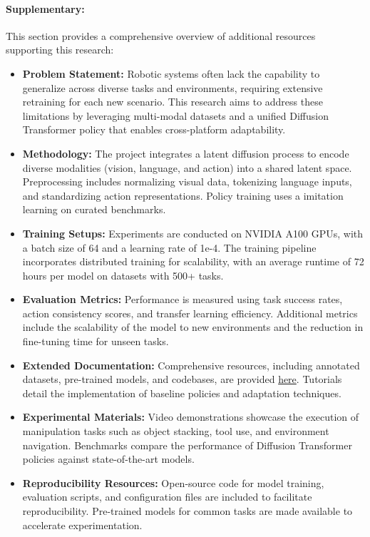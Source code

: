 \documentclass[12pt]{article}
\begin{document}
\paragraph{Supplementary:} This section provides a comprehensive overview of additional resources supporting this research:
\begin{itemize}
    \item \textbf{Problem Statement:} Robotic systems often lack the capability to generalize across diverse tasks and environments, requiring extensive retraining for each new scenario. This research aims to address these limitations by leveraging multi-modal datasets and a unified Diffusion Transformer policy that enables cross-platform adaptability.
    \item \textbf{Methodology:} The project integrates a latent diffusion process to encode diverse modalities (vision, language, and action) into a shared latent space. Preprocessing includes normalizing visual data, tokenizing language inputs, and standardizing action representations. Policy training uses a imitation learning on curated benchmarks.
    \item \textbf{Training Setups:} Experiments are conducted on NVIDIA A100 GPUs, with a batch size of 64 and a learning rate of 1e-4. The training pipeline incorporates distributed training for scalability, with an average runtime of 72 hours per model on datasets with 500+ tasks.
    \item \textbf{Evaluation Metrics:} Performance is measured using task success rates, action consistency scores, and transfer learning efficiency. Additional metrics include the scalability of the model to new environments and the reduction in fine-tuning time for unseen tasks.
    \item \textbf{Extended Documentation:} Comprehensive resources, including annotated datasets, pre-trained models, and codebases, are provided \href{https://robotics-transformer-x.github.io/}{here}. Tutorials detail the implementation of baseline policies and adaptation techniques.
    \item \textbf{Experimental Materials:} Video demonstrations showcase the execution of manipulation tasks such as object stacking, tool use, and environment navigation. Benchmarks compare the performance of Diffusion Transformer policies against state-of-the-art models.
    \item \textbf{Reproducibility Resources:} Open-source code for model training, evaluation scripts, and configuration files are included to facilitate reproducibility. Pre-trained models for common tasks are made available to accelerate experimentation.
\end{itemize}



\end{document}
